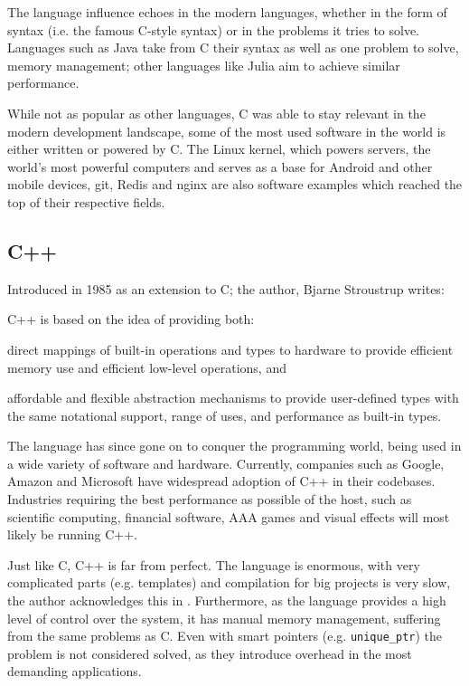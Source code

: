 The language influence echoes in the modern languages,
whether in the form of syntax (i.e. the famous C-style syntax) or in the problems it tries to solve.
Languages such as Java take from C their syntax as well as one problem to solve, memory management;
other languages like Julia \autocite{Bezanson2017} aim to achieve similar performance.

While not as popular as other languages, C was able to stay relevant in the modern development landscape,
some of the most used software in the world is either written or powered by C.
The Linux kernel, which powers servers, the world's most powerful computers
and serves as a base for Android and other mobile devices,
git, Redis and nginx are also software examples which reached the top of their respective fields.

\subsection{C++}

Introduced in 1985 as an extension to C; the author, Bjarne Stroustrup writes:

\begin{displayquote}
    C++  is  based  on  the idea of providing both:
    \begin{compactitem}
        \item direct mappings of built-in operations and types to hardware to provide efficient memory use and efficient low-level operations, and
        \item affordable and flexible abstraction mechanisms to provide user-defined types with the same notational support, range of uses, and performance as built-in types.
    \end{compactitem}
\end{displayquote}

The language has since gone on to conquer the programming world, being used in a wide variety of software and hardware.
Currently, companies such as Google, Amazon and Microsoft have widespread adoption of C++ in their codebases.
Industries requiring the best performance as possible of the host, such as scientific computing,
financial software, AAA games and visual effects will most likely be running C++.

Just like C, C++ is far from perfect.
The language is enormous, with very complicated parts (e.g. templates) and compilation for big projects is very slow,
the author acknowledges this in \autocite{Torre2014}.
Furthermore, as the language provides a high level of control over the system, it has manual memory management,
suffering from the same problems as C.
Even with smart pointers (e.g. \texttt{unique\_ptr}) the problem is not considered solved,
as they introduce overhead in the most demanding applications.


